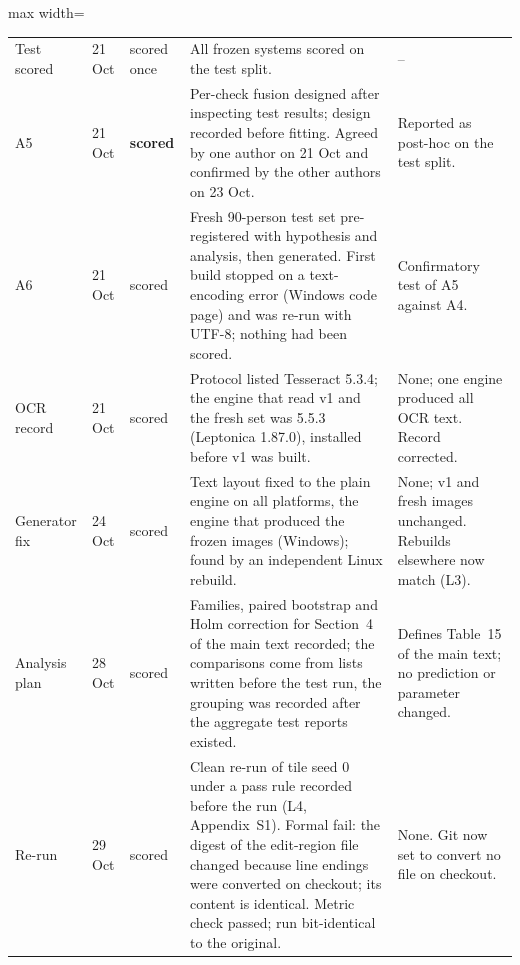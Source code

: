 \documentclass[12pt]{article}
\begin{document}
\begin{table}[H]
\begin{adjustbox}{max width=\linewidth}
\begin{tabular}{@{}l l l p{} p{}@{}}
Test scored & 21 Oct & scored once & All frozen systems scored on the test split. & -- \\
A5 & 21 Oct & \textbf{scored}
  & Per-check fusion designed after inspecting test results; design recorded before fitting. Agreed by one author on 21 Oct and confirmed by the other authors on 23 Oct.
  & Reported as post-hoc on the test split. \\
A6 & 21 Oct & scored
  & Fresh 90-person test set pre-registered with hypothesis and analysis, then generated. First build stopped on a text-encoding error (Windows code page) and was re-run with UTF-8; nothing had been scored.
  & Confirmatory test of A5 against A4. \\
OCR record & 21 Oct & scored
  & Protocol listed Tesseract 5.3.4; the engine that read v1 and the fresh set was 5.5.3 (Leptonica 1.87.0), installed before v1 was built.
  & None; one engine produced all OCR text. Record corrected. \\
Generator fix & 24 Oct & scored
  & Text layout fixed to the plain engine on all platforms, the engine that produced the frozen images (Windows); found by an independent Linux rebuild.
  & None; v1 and fresh images unchanged. Rebuilds elsewhere now match (L3). \\
Analysis plan & 28 Oct & scored
  & Families, paired bootstrap and Holm correction for Section~4 of the main text recorded; the comparisons come from lists written before the test run, the grouping was recorded after the aggregate test reports existed.
  & Defines Table~15 of the main text; no prediction or parameter changed. \\
Re-run & 29 Oct & scored
  & Clean re-run of tile seed 0 under a pass rule recorded before the run (L4, Appendix~S1). Formal fail: the digest of the edit-region file changed because line endings were converted on checkout; its content is identical. Metric check passed; run bit-identical to the original.
  & None. Git now set to convert no file on checkout. \\
\bottomrule
\end{tabular}
\end{adjustbox}
\end{table}
\end{document}
